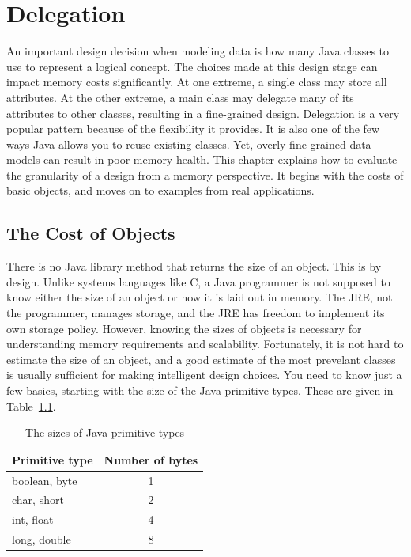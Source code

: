 \chapter{Delegation}

An important design decision when modeling data is how many Java classes to use to represent a logical concept. The choices made at this design stage can impact memory costs significantly. At one extreme, a single class may store all attributes. At the other extreme, a main class may delegate many of its attributes to other classes, resulting in a fine-grained design. Delegation is a very popular pattern because of the flexibility it provides. It is also one of the few ways Java allows you to reuse existing classes. Yet, overly fine-grained data models can result in poor memory health. This chapter explains how to evaluate the granularity of a design from a memory perspective. It begins with the costs of basic objects, and moves on to examples from real applications.
  
\section{The Cost of Objects}
\label{sec:CostOfObjects}

There is no Java library method that returns the size of an object. This is by design. Unlike systems languages like C, a Java programmer is not supposed to know either the size of an object or how it is laid out in memory. The JRE, not the programmer, manages storage, and the JRE has freedom to implement its own storage policy. However, knowing the sizes of objects is necessary for understanding memory requirements and scalability. Fortunately, it is not hard to estimate the size of an object, and a good estimate of the most prevelant classes is usually sufficient for making intelligent design choices.  You need to know just a few basics, starting with the size of the Java primitive types. These are given in Table~\ref{tab:primitive-sizes}.
\begin{table}
  \centering
\begin{tabular}{lc} \toprule
	Primitive type & Number of bytes \\ \midrule
	boolean, byte & 1 \\
	char, short & 2 \\
	int, float & 4 \\
	long, double & 8 \\
	\bottomrule
\end{tabular}
  \caption{The sizes of Java primitive types}
  \label{tab:primitive-sizes}
\end{table}

